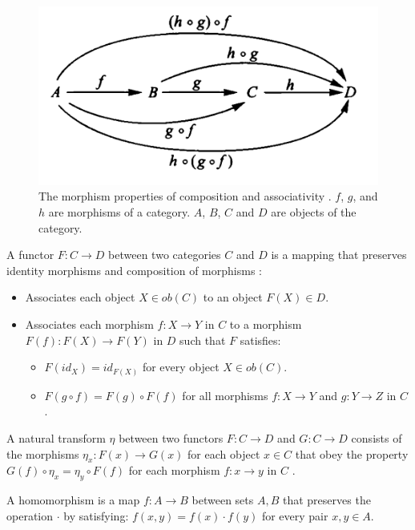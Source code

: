 \begin{figure}[H]
    \centering
    \includegraphics[scale = 0.8]{1Introduction/Old/Images/fig-morphisms.png}
    \caption{The morphism properties of composition and associativity \autocite{associativity2019}.
    $f$, $g$, and $h$ are morphisms of a category.
    $A$, $B$, $C$ and $D$ are objects of the category.}
    \label{fig:morphisms}
\end{figure}

A functor $F: C \to D$ between two categories $C$ and $D$ is a mapping that preserves identity morphisms and composition of morphisms \autocite{functor2020}:
\begin{itemize}
    \item Associates each object $X \in ob(C)$ to an object $F(X) \in D$.
    \item Associates each morphism $f: X \to Y$ in $C$ to a morphism $F(f): F(X) \to F(Y)$ in $D$ such that $F$ satisfies:
    \begin{itemize}
        \item $F(id_{X}) = id_{F(X)}$ for every object $X \in ob(C)$.
        \item $F(g \circ f) = F(g) \circ F(f)$ for all morphisms $f: X \to Y$ and $g: Y \to Z$ in $C$.
    \end{itemize}
\end{itemize}

A natural transform $\eta$ between two functors $F: C \to D$ and $G: C \to D$ consists of the morphisms $\eta_{x}: F(x) \to G(x)$ for each object $x \in C$ that obey the property $G(f) \circ \eta_x = \eta_y \circ F(f)$ for each morphism $f: x \to y$ in $C$ \autocite{natural_transform2020}.

A homomorphism is a map $f: A \to B$ between sets $A, B$ that preserves the operation $\cdot$ by satisfying: $f(x, y) = f(x) \cdot f(y)$ for every pair $x, y \in A$.


